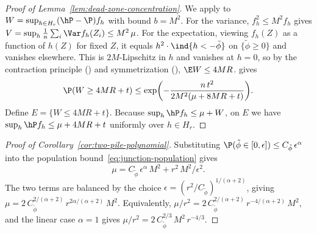 \documentclass{article}
\begin{document}
\begin{proof}[Proof of Lemma~\ref{lem:dead-zone-concentration}]
We apply  to
$W = \sup_{h \in H_r} (\hP - \P) f_h$
with bound $b = M^2$.
For the variance, $f_h^2 \le M^2 f_h$ gives
$V = \sup_h \frac{1}{n}\sum_i \Var f_h(Z_i)
  \le M^2\, \mu$.
For the expectation,
viewing $f_h(Z)$ as a function of $h(Z)$ for fixed $Z$,
it equals $h^2 \cdot \ind{h < -\tilde\phi}$
on $\{\tilde\phi \ge 0\}$
and vanishes elsewhere.
This is $2M$-Lipschitz in $h$ and vanishes at $h = 0$,
so by the contraction principle ()
and symmetrization (),
$\E W \le 4MR$.
 gives
\[
\P(W \ge 4MR + t)
  \le \exp\!\qty(-\frac{n\, t^2}
    {2M^2(\mu + 8MR + t)}).
\]
Define $E = \{W \le 4MR + t\}$.
Because $\sup_h \hP f_h \le \mu + W$,
on $E$ we have $\sup_h \hP f_h \le \mu + 4MR + t$
uniformly over $h \in H_r$.
\end{proof}

\begin{proof}[Proof of Corollary~\ref{cor:two-pile-polynomial}]
Substituting
$\P(\tilde\phi \in [0,\epsilon])
  \le C_{\tilde\phi}\, \epsilon^\alpha$
into the population bound~\eqref{eq:junction-population}
gives
\[
\mu = C_{\tilde\phi}\, \epsilon^\alpha\, M^2
  + r^2\, M^2 / \epsilon^2.
\]
The two terms are balanced
by the choice
$\epsilon = (r^2/C_{\tilde\phi})^{1/(\alpha+2)}$,
giving $\mu
  = 2\, C_{\tilde\phi}^{2/(\alpha+2)}\,
    r^{2\alpha/(\alpha+2)}\, M^2$.
Equivalently,
$\mu/r^2 = 2\, C_{\tilde\phi}^{2/(\alpha+2)}\,
  r^{-4/(\alpha+2)}\, M^2$,
and the linear case $\alpha = 1$
gives $\mu/r^2 = 2\, C_{\tilde\phi}^{2/3}\, M^2\, r^{-4/3}$.
\end{proof}
\end{document}
